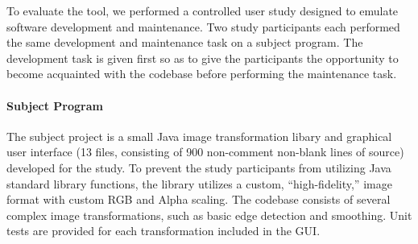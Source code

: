 \documentclass[nocopyrightspace,10pt]{sigplanconf}
\begin{document}

To evaluate the tool, we performed a controlled user study designed to
emulate software development and maintenance.  Two study participants
each performed the same development and maintenance task on a subject
program. The development task is given first so as to give the
participants the opportunity to become acquainted with the codebase
before performing the maintenance task.

\paragraph{Subject Program}
The subject project is a small Java image transformation libary and
graphical user interface (13 files, consisting of 900 non-comment
non-blank lines of source) developed for the study. To prevent the
study participants from utilizing Java standard library functions, the
library utilizes a custom, ``high-fidelity,'' image format with custom
RGB and Alpha scaling. The codebase consists of several complex image
transformations, such as basic edge detection and smoothing. Unit tests
are provided for each transformation included in the GUI.


\end{document}
